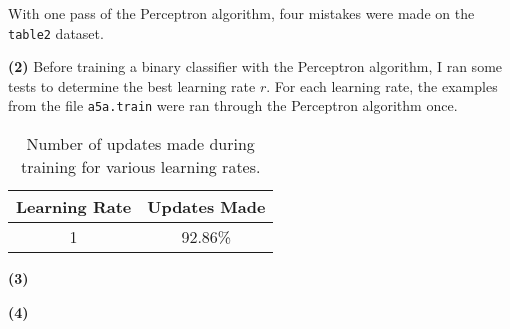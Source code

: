 \documentclass[11pt]{article}
\renewcommand\part[1]{\vspace{.10in}\textbf{(#1)}}
\begin{document}
With one pass of the Perceptron algorithm, four mistakes were made on the \texttt{table2} dataset.


\part{2} Before training a binary classifier with the Perceptron algorithm, I ran some tests to determine the best learning rate $r$. For each learning rate, the examples from the file \texttt{a5a.train} were ran through the Perceptron algorithm once.
\begin{table}[H]
\centering
\begin{tabular}{| c | c |}
\hline
Learning Rate& Updates Made\\
\hline
1 & 92.86\%\\
\hline
\end{tabular}
\caption{Number of updates made during training for various learning rates.}
\end{table}


\part{3}

\part{4}
\end{document}
